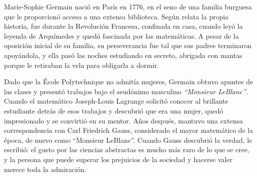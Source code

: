 \documentclass[11pt, letterpaper]{article}
\begin{document}
\begin{tcolorbox}[enhanced, breakable,
  colback=white, colframe=blockb, colbacktitle=blockb,
  coltitle=white, arc=4pt, leftrule=5pt,
  left=10pt, right=10pt, top=12pt, bottom=10pt,
  fonttitle=\bfseries,
  attach boxed title to top left={xshift=0.5cm, yshift*=-\tcboxedtitleheight/2},
  boxed title style={colframe=blockb, colback=blockb, arc=2pt},
  title={Sophie Germain \hfill \normalfont\itshape 1776--1831}]

\begin{minipage}[t]{0.18\linewidth}
\vspace{0pt}
\end{minipage}
\hfill
\begin{minipage}[t]{0.78\linewidth}
\vspace{0pt}
Marie-Sophie Germain naci\'o en Par\'is en 1776, en el seno de una familia burguesa que le proporcion\'o acceso a una extensa biblioteca. Seg\'un relata la propia historia, fue durante la Revoluci\'on Francesa, confinada en casa, cuando ley\'o la leyenda de Arqu\'imedes y qued\'o fascinada por las matem\'aticas. A pesar de la oposici\'on inicial de su familia, su perseverancia fue tal que sus padres terminaron apoy\'andola, y ella pas\'o las noches estudiando en secreto, abrigada con mantas porque le retiraban la vela para obligarla a dormir.

\medskip
Dado que la \'Ecole Polytechnique no admit\'ia mujeres, Germain obtuvo apuntes de las clases y present\'o trabajos bajo el seud\'onimo masculino \textit{``Monsieur LeBlanc''}. Cuando el matem\'atico Joseph-Louis Lagrange solicit\'o conocer al brillante estudiante detr\'as de esos trabajos y descubri\'o que era una mujer, qued\'o impresionado y se convirti\'o en su mentor. A\~nos despu\'es, mantuvo una extensa correspondencia con Carl Friedrich Gauss, considerado el mayor matem\'atico de la \'epoca, de nuevo como ``Monsieur LeBlanc''. Cuando Gauss descubri\'o la verdad, le escribi\'o: el gusto por las ciencias abstractas es mucho m\'as raro de lo que se cree, y la persona que puede superar los prejuicios de la sociedad y hacerse valer merece toda la admiraci\'on.


\end{minipage}
\end{tcolorbox}
\end{document}
